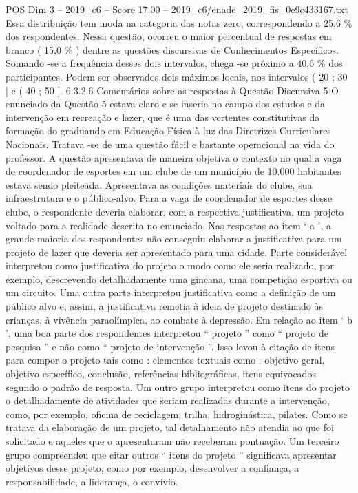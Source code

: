 \begin{textsample}{POS Dim 3 – 2019\_c6 – Score 17.00 – 2019\_c6/enade\_2019\_fis\_0e9c433167.txt}
Essa distribuição tem moda na categoria das notas zero, correspondendo a 25,6 \% dos respondentes.
Nessa questão, ocorreu o maior percentual de respostas em branco ( 15,0 \% ) dentre as questões discursivas de Conhecimentos Específicos.
Somando -se a frequência desses dois intervalos, chega -se próximo a 40,6 \% dos participantes.
Podem ser observados dois máximos locais, nos intervalos ( 20 ; 30 ] e ( 40 ; 50 ]. 6.3.2.6 Comentários sobre as respostas à Questão Discursiva 5 O enunciado da Questão 5 estava claro e se inseria no campo dos estudos e da intervenção em recreação e lazer, que é uma das vertentes constitutivas da formação do graduando em Educação Física à luz das Diretrizes Curriculares Nacionais.
Tratava -se de uma questão fácil e bastante operacional na vida do professor.
A questão apresentava de maneira objetiva o contexto no qual a vaga de coordenador de esportes em um clube de um município de 10.000 habitantes estava sendo pleiteada.
Apresentava as condições materiais do clube, sua infraestrutura e o público-alvo.
Para a vaga de coordenador de esportes desse clube, o respondente deveria elaborar, com a respectiva justificativa, um projeto voltado para a realidade descrita no enunciado.
Nas respostas ao item ‘ a ’, a grande maioria dos respondentes não conseguiu elaborar a justificativa para um projeto de lazer que deveria ser apresentado para uma cidade.
Parte considerável interpretou como justificativa do projeto o modo como ele seria realizado, por exemplo, descrevendo detalhadamente uma gincana, uma competição esportiva ou um circuito.
Uma outra parte interpretou justificativa como a definição de um público alvo e, assim, a justificativa remetia à ideia de projeto destinado às crianças, à vivência paraolímpica, ao combate à depressão.
Em relação ao item ‘ b ’, uma boa parte dos respondentes interpretou “ projeto ” como “ projeto de pesquisa ” e não como “ projeto de intervenção ”.
Isso levou à citação de itens para compor o projeto tais como : elementos textuais como : objetivo geral, objetivo específico, conclusão, referências bibliográficas, itens equivocados segundo o padrão de resposta.
Um outro grupo interpretou como itens do projeto o detalhadamente de atividades que seriam realizadas durante a intervenção, como, por exemplo, oficina de reciclagem, trilha, hidroginástica, pilates.
Como se tratava da elaboração de um projeto, tal detalhamento não atendia ao que foi solicitado e aqueles que o apresentaram não receberam pontuação.
Um terceiro grupo compreendeu que citar outros “ itens do projeto ” significava apresentar objetivos desse projeto, como por exemplo, desenvolver a confiança, a responsabilidade, a liderança, o convívio.

\end{textsample}

